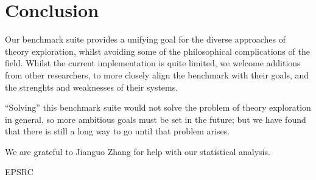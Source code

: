 \section{Conclusion}
\label{sec:conclusion}

Our benchmark suite provides a unifying goal for the diverse approaches of
theory exploration, whilst avoiding some of the philosophical complications of
the field. Whilst the current implementation is quite limited, we welcome
additions from other researchers, to more closely align the benchmark with their
goals, and the strenghts and weaknesses of their systems.

``Solving'' this benchmark suite would not solve the problem of theory exploration in general,
so more ambitious goals must be set in the future; but we have found that there is still a
long way to go until that problem arises.

\begin{acknowledgements}
  We are grateful to Jianguo Zhang for help with our statistical analysis.

  EPSRC
\end{acknowledgements}





